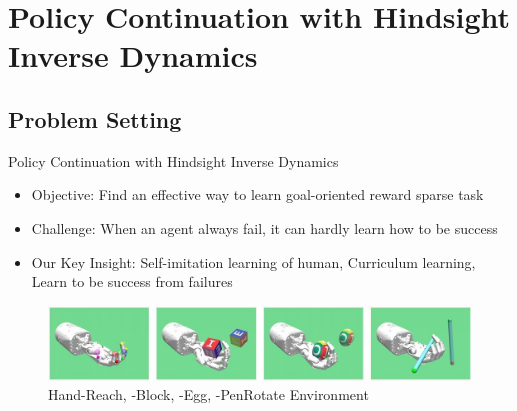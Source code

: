 \documentclass[10pt,hyperref={CJKbookmarks=true},envcountsect,mathserif]{beamer}
\begin{document}
\section{Policy Continuation with Hindsight Inverse Dynamics}
\subsection{Problem Setting}
\begin{frame}{Policy Continuation with Hindsight Inverse Dynamics}

\begin{itemize}
\item Objective: Find an effective way to learn goal-oriented reward sparse task
\item Challenge: When an agent always fail, it can hardly learn how to be success
\item Our Key Insight: Self-imitation learning of human, Curriculum learning, Learn to be success from failures
\end{itemize}
\begin{figure}
\centering
\includegraphics[width=1\linewidth]{figures/handenvs.jpeg}
\caption{Hand-Reach, -Block, -Egg, -PenRotate Environment}
\end{figure}

\end{frame}
\end{document}
